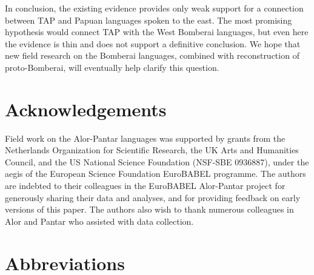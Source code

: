 In conclusion, the existing evidence provides only weak support for a connection between TAP and Papuan languages spoken to the east. The most promising hypothesis would connect TAP with the West Bomberai languages, but even here the evidence is thin and does not support a definitive conclusion. We hope that new field research on the Bomberai languages, combined with reconstruction of proto-Bomberai, will eventually help clarify this question.

\section*{Acknowledgements}

Field work on the Alor-Pantar languages was supported by grants from the Netherlands Organization for Scientific Research, the UK Arts and Humanities Council, and the US National Science Foundation (NSF-SBE 0936887), under the aegis of the European Science Foundation EuroBABEL programme. The authors are indebted to their colleagues in the \mbox{EuroBABEL} Alor-Pantar project for generously sharing their data and analyses, and for providing feedback on early versions of this paper. The authors also wish to thank numerous colleagues in Alor and Pantar who assisted with data collection.

\section*{Abbreviations}


